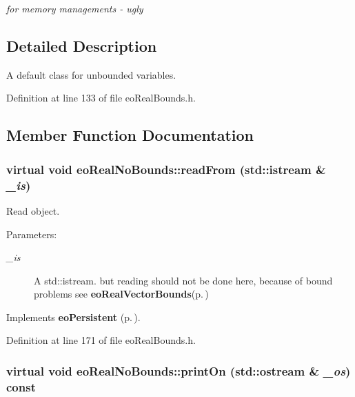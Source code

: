 \begin{CompactItemize}
\begin{CompactList}\small\item\em for memory managements - ugly \item\end{CompactList}\end{CompactItemize}


\subsection{Detailed Description}
A default class for unbounded variables. 



Definition at line 133 of file eo\-Real\-Bounds.h.

\subsection{Member Function Documentation}
\subsubsection{\setlength{\rightskip}{0pt plus 5cm}virtual void eo\-Real\-No\-Bounds::read\-From (std::istream \& {\em \_\-is})\hspace{0.3cm}{\tt  [inline, virtual]}}\label{classeo_real_no_bounds_a12}


Read object. 

\begin{Desc}
\item[Parameters:]
\begin{description}
\item[{\em \_\-is}]A std::istream. but reading should not be done here, because of bound problems see {\bf eo\-Real\-Vector\-Bounds}{\rm (p.\,\pageref{classeo_real_vector_bounds})} \end{description}
\end{Desc}


Implements {\bf eo\-Persistent} {\rm (p.\,\pageref{classeo_persistent_a1})}.

Definition at line 171 of file eo\-Real\-Bounds.h.
\subsubsection{\setlength{\rightskip}{0pt plus 5cm}virtual void eo\-Real\-No\-Bounds::print\-On (std::ostream \& {\em \_\-os}) const\hspace{0.3cm}{\tt  [inline, virtual]}}\label{classeo_real_no_bounds_a13}


